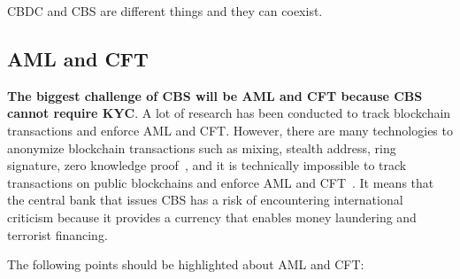 \documentclass[dvipdfmx,a4paper]{article}
\begin{document}
CBDC and CBS are different things and they can coexist.

\subsection{AML and CFT}

\textbf{The biggest challenge of CBS will be AML and CFT because CBS cannot require KYC}. A lot of research has been conducted to track blockchain transactions and enforce AML and CFT. However, there are many technologies to anonymize blockchain transactions such as mixing, stealth address, ring signature, zero knowledge proof~\cite{sasson2014zerocash}, and it is technically impossible to track transactions on public blockchains and enforce AML and CFT~\cite{zhang2019security}. It means that the central bank that issues CBS has a risk of encountering international criticism because it provides a currency that enables money laundering and terrorist financing.

The following points should be highlighted about AML and CFT:
\end{document}
